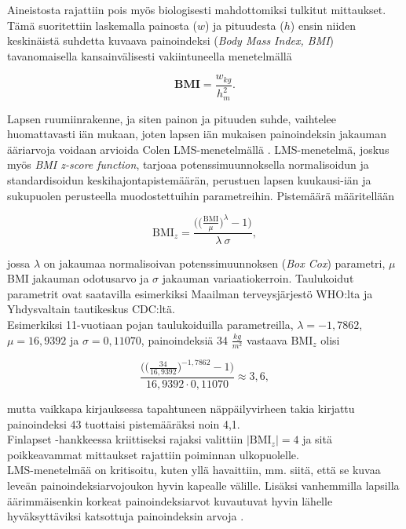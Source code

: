 \documentclass[finnish]{docopts}
\begin{document}
Aineistosta rajattiin pois myös biologisesti mahdottomiksi tulkitut mittaukset. Tämä suoritettiin laskemalla painosta ($w$) ja pituudesta ($h$) ensin niiden keskinäistä suhdetta kuvaava painoindeksi (\textit{Body Mass Index, BMI}) tavanomaisella kansainvälisesti vakiintuneella menetelmällä

$$
\textbf{BMI} = \frac{w_{kg}}{h_{m}^2}.
$$

Lapsen ruumiinrakenne, ja siten painon ja pituuden suhde, vaihtelee huomattavasti iän mukaan, joten lapsen iän mukaisen painoindeksin jakauman ääriarvoja voidaan arvioida Colen LMS-menetelmällä \cite{cole90}. LMS-menetelmä, joskus myös \textit{BMI z-score function}, tarjoaa potenssimuunnoksella normalisoidun ja standardisoidun keskihajontapistemäärän, perustuen lapsen kuukausi-iän ja sukupuolen perusteella muodostettuihin parametreihin. Pistemäärä määritellään

$$
\text{BMI}_z = \frac{\bigg( \big( \frac{\text{BMI}}{\mu}\big)^\lambda - 1 \bigg)}{\lambda \ \sigma},
$$

jossa $\lambda$ on jakaumaa normalisoivan potenssimuunnoksen (\textit{Box Cox}) parametri, $\mu$ BMI jakauman odotusarvo ja $\sigma$ jakauman variaatiokerroin. Taulukoidut parametrit ovat saatavilla esimerkiksi Maailman terveysjärjestö WHO:lta ja Yhdysvaltain tautikeskus CDC:ltä.\\

Esimerkiksi 11-vuotiaan pojan taulukoiduilla parametreilla, $\lambda = -1,7862$, $\mu = 16,9392$ ja $\sigma = 0,11070$, painoindeksiä 34 $\frac{kg}{m^2}$ vastaava $\text{BMI}_z$ olisi

$$
\frac{\bigg( \big( \frac{34}{16,9392}\big)^{-1,7862} - 1 \bigg)}{16,9392 \cdot 0,11070} \approx 3,6,
$$

mutta vaikkapa kirjauksessa tapahtuneen näppäilyvirheen takia kirjattu painoindeksi 43 tuottaisi pistemääräksi noin 4,1.\\

Finlapset -hankkeessa kriittiseksi rajaksi valittiin $|\text{BMI}_z| = 4$ ja sitä poikkeavammat mittaukset rajattiin poiminnan ulkopuolelle.\\

LMS-menetelmää on kritisoitu, kuten yllä havaittiin, mm. siitä, että se kuvaa leveän painoindeksiarvojoukon hyvin kapealle välille. Lisäksi vanhemmilla lapsilla äärimmäisenkin korkeat painoindeksiarvot kuvautuvat hyvin lähelle hyväksyttäviksi katsottuja painoindeksin arvoja \cite{flegal13, cdc13}. \\
\end{document}
